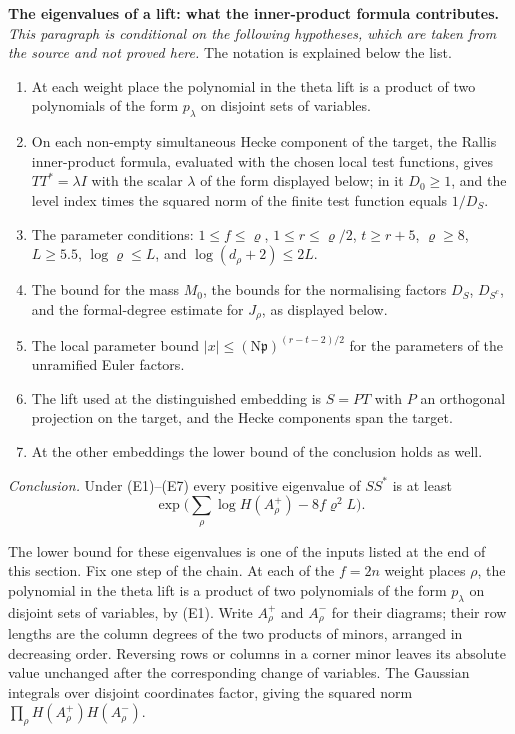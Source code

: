 \documentclass[11pt,letterpaper]{article}
\begin{document}
\textbf{The eigenvalues of a lift: what the inner-product formula contributes.} \emph{This paragraph is
conditional on the following hypotheses, which are taken from the source and not proved here.} The
notation is explained below the list.
\begin{enumerate}[label=\textup{(E\arabic*)},leftmargin=2.6em,itemsep=1pt,topsep=3pt]
\item At each weight place the polynomial in the theta lift is a product of two polynomials of the form
$p_\lambda$ on disjoint sets of variables.
\item On each non-empty simultaneous Hecke component of the target, the Rallis inner-product formula,
evaluated with the chosen local test functions, gives $TT^*=\lambda I$ with the scalar $\lambda$ of the
form displayed below; in it $D_0\ge1$, and the level index times the squared norm of the finite test
function equals $1/D_S$.
\item The parameter conditions: $1\le f\le\varrho$, $1\le r\le\varrho/2$, $t\ge r+5$, $\varrho\ge8$,
$L\ge5.5$, $\log\varrho\le L$, and $\log(d_\rho+2)\le2L$.
\item The bound for the mass $M_0$, the bounds for the normalising factors $D_S$, $D_{S^c}$, and the
formal-degree estimate for $J_\rho$, as displayed below.
\item The local parameter bound $|x|\le(\mathrm N\mathfrak p)^{(r-t-2)/2}$ for the parameters of the
unramified Euler factors.
\item The lift used at the distinguished embedding is $S=PT$ with $P$ an orthogonal projection on the
target, and the Hecke components span the target.
\item At the other embeddings the lower bound of the conclusion holds as well.
\end{enumerate}
\emph{Conclusion.} Under (E1)--(E7) every positive eigenvalue of $SS^*$ is at least
\begin{equation}\label{D:171}
 \exp\Big(\sum_\rho\log H(A_\rho^+)-8f\varrho^2L\Big).
\end{equation}

\noindent The lower bound for these eigenvalues is one of the inputs listed at the end of this section.
Fix one step of the chain. At each of the $f=2n$ weight places $\rho$,
the polynomial in the theta lift is a product of two polynomials of the
form $p_\lambda$ on disjoint sets of variables, by (E1). Write $A_\rho^+$ and
$A_\rho^-$ for their diagrams; their row lengths are the column degrees
of the two products of minors, arranged in decreasing order. Reversing
rows or columns in a corner minor leaves its absolute value unchanged
after the corresponding change of variables. The Gaussian integrals
over disjoint coordinates factor, giving the squared norm
$\prod_\rho H(A_\rho^+)H(A_\rho^-)$.
\end{document}
